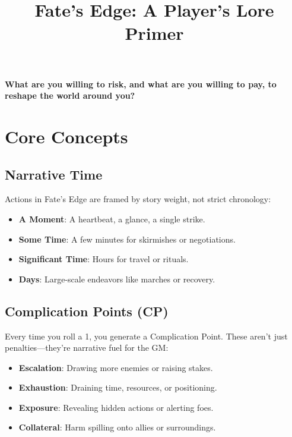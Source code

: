\documentclass[11pt,twoside]{article}
\title{Fate's Edge: A Player's Lore Primer}
\author{}
\date{}
\begin{document}
\maketitle
\thispagestyle{fancy}

\begin{center}
\textbf{What are you willing to risk, and what are you willing to pay, to reshape the world around you?}
\end{center}

\vspace{1em}

\tableofcontents

\newpage

\section{Core Concepts}

\subsection{Narrative Time}
Actions in Fate's Edge are framed by story weight, not strict chronology:
\begin{itemize}[leftmargin=*]
    \item \textbf{A Moment}: A heartbeat, a glance, a single strike.
    \item \textbf{Some Time}: A few minutes for skirmishes or negotiations.
    \item \textbf{Significant Time}: Hours for travel or rituals.
    \item \textbf{Days}: Large-scale endeavors like marches or recovery.
\end{itemize}

\subsection{Complication Points (CP)}
Every time you roll a 1, you generate a Complication Point. These aren't just penalties—they're narrative fuel for the GM:
\begin{itemize}[leftmargin=*]
    \item \textbf{Escalation}: Drawing more enemies or raising stakes.
    \item \textbf{Exhaustion}: Draining time, resources, or positioning.
    \item \textbf{Exposure}: Revealing hidden actions or alerting foes.
    \item \textbf{Collateral}: Harm spilling onto allies or surroundings.
\end{itemize}
\end{document}
